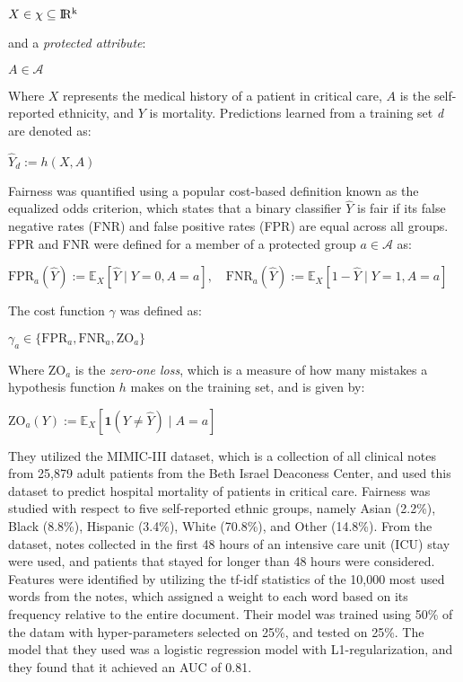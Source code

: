 \documentclass[12pt]{article}
\begin{document}
\begin{center}
    $X \in \chi \subseteq \rm I\!R^k$
\end{center}

\noindent and a \textit{protected attribute}:

\begin{center}
    $A \in \mathcal{A}$
\end{center}

Where $X$ represents the medical history of a patient in critical care, $A$ is the self-reported ethnicity, and $Y$ is mortality. Predictions learned from a training set \textit{d} are denoted as:

\begin{center}
    $\hat{Y}_d := h(X,A)$
\end{center}

Fairness was quantified using a popular cost-based definition known as the equalized odds criterion, which states that a binary classifier \textit{$\hat{Y}$} is fair if its false negative rates (FNR) and false positive rates (FPR) are equal across all groups. FPR and FNR were defined for a member of a protected group $a \in \mathcal{A}$ as:

\begin{center}
    $\text{FPR}_a(\hat{Y}) := \mathbb{E}_X[\hat{Y} \mid Y = 0, A = a], \quad \text{FNR}_a(\hat{Y}) := \mathbb{E}_X[1 - \hat{Y} \mid Y = 1, A = a]$
\end{center}

\newpage

\noindent The cost function $\gamma$ was defined as:

\begin{center}
    $\gamma_a \in \{\text{FPR}_a, \text{FNR}_a, \text{ZO}_a\}$
\end{center}

Where $\text{ZO}_a$ is the \textit{zero-one loss}, which is a measure of how many mistakes a hypothesis function $h$ makes on the training set, and is given by:

\begin{center}
    $\text{ZO}_a(Y) := \mathbb{E}_X[ \mathbf{1}(Y \neq \hat{Y}) \mid A = a]$
\end{center}

They utilized the MIMIC-III dataset, which is a collection of all clinical notes from 25,879 adult patients from the Beth Israel Deaconess Center, and used this dataset to predict hospital mortality of patients in critical care. Fairness was studied with respect to five self-reported ethnic groups, namely Asian (2.2\%), Black (8.8\%), Hispanic (3.4\%), White (70.8\%), and Other (14.8\%). From the dataset, notes collected in the first 48 hours of an intensive care unit (ICU) stay were used, and patients that stayed for longer than 48 hours were considered. Features were identified by utilizing the tf-idf statistics of the 10,000 most used words from the notes, which assigned a weight to each word based on its frequency relative to the entire document. Their model was trained using 50\% of the datam with hyper-parameters selected on 25\%, and tested on 25\%. The model that they used was a logistic regression model with L1-regularization, and they found that it achieved an AUC of 0.81.\ 
\end{document}
